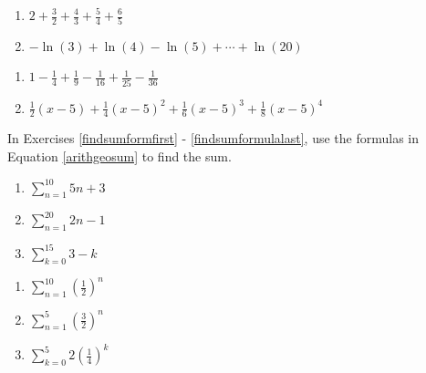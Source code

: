 \begin{multicols}{2}
\begin{enumerate}
\setcounter{enumi}{\value{HW}}

\item $2 + \frac{3}{2} + \frac{4}{3} + \frac{5}{4} + \frac{6}{5}$
\item $-\ln(3) + \ln(4) - \ln(5) + \cdots + \ln(20)$

\setcounter{HW}{\value{enumi}}
\end{enumerate}
\end{multicols}

\begin{multicols}{2}
\begin{enumerate}
\setcounter{enumi}{\value{HW}}

\item $1 - \frac{1}{4} + \frac{1}{9} - \frac{1}{16} + \frac{1}{25} - \frac{1}{36}$
\item $\frac{1}{2}(x - 5) + \frac{1}{4}(x - 5)^{2} + \frac{1}{6}(x - 5)^{3} + \frac{1}{8}(x - 5)^{4}$  \label{writesumlast}

\setcounter{HW}{\value{enumi}}
\end{enumerate}
\end{multicols}


In Exercises \ref{findsumformfirst} - \ref{findsumformulalast}, use the formulas in Equation \ref{arithgeosum} to find the sum.

\begin{multicols}{3}
\begin{enumerate}
\setcounter{enumi}{\value{HW}}

\item $\displaystyle \sum_{n = 1}^{10} 5n+3$ \label{findsumformfirst}

\item $\displaystyle \sum_{n = 1}^{20} 2n-1$ 

\item $\displaystyle \sum_{k = 0}^{15} 3-k$ 

\setcounter{HW}{\value{enumi}}
\end{enumerate}
\end{multicols}

\begin{multicols}{3}
\begin{enumerate}
\setcounter{enumi}{\value{HW}}

\item $\displaystyle \sum_{n = 1}^{10} \left(\frac{1}{2}\right)^{n}$

\item $\displaystyle \sum_{n = 1}^{5} \left(\frac{3}{2}\right)^{n}$ 

\item $\displaystyle \sum_{k = 0}^{5} 2\left(\frac{1}{4}\right)^{k}$ 

\setcounter{HW}{\value{enumi}}
\end{enumerate}
\end{multicols}

